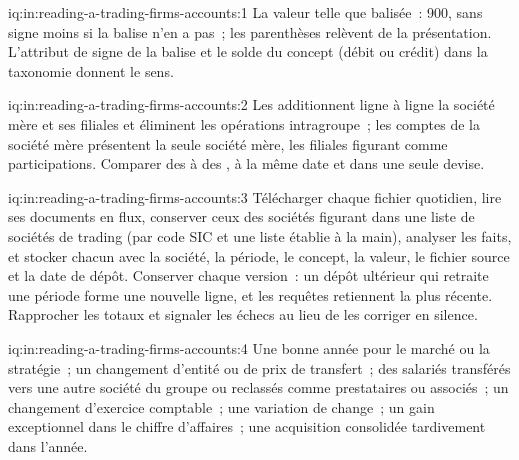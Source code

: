 \begin{solution}{iq:in:reading-a-trading-firms-accounts:1}
La valeur telle que balisée~: 900, sans signe moins si la balise n'en a pas~; les parenthèses relèvent de la présentation. L'attribut de signe de
la balise et le solde du concept (débit ou crédit) dans la taxonomie donnent le sens.
\end{solution}

\begin{solution}{iq:in:reading-a-trading-firms-accounts:2}
Les  additionnent ligne à ligne la société mère et ses filiales et éliminent les opérations intragroupe~; les comptes de la société mère
présentent la seule société mère, les filiales figurant comme participations. Comparer des  à des , à la même
date et dans une seule devise.
\end{solution}

\begin{solution}{iq:in:reading-a-trading-firms-accounts:3}
Télécharger chaque fichier quotidien, lire ses documents en flux, conserver ceux des sociétés figurant dans une liste de sociétés de trading (par code SIC et une
liste établie à la main), analyser les faits, et stocker chacun avec la société, la période, le concept, la valeur, le fichier source et la date de dépôt.
Conserver chaque version~: un dépôt ultérieur qui retraite une période forme une nouvelle ligne, et les requêtes retiennent la plus récente. Rapprocher les totaux
et signaler les échecs au lieu de les corriger en silence.
\end{solution}

\begin{solution}{iq:in:reading-a-trading-firms-accounts:4}
Une bonne année pour le marché ou la stratégie~; un changement d'entité ou de prix de transfert~; des salariés transférés vers une autre société du groupe
ou reclassés comme prestataires ou associés~; un changement d'exercice comptable~; une variation de change~; un gain exceptionnel dans
le chiffre d'affaires~; une acquisition consolidée tardivement dans l'année.
\end{solution}

